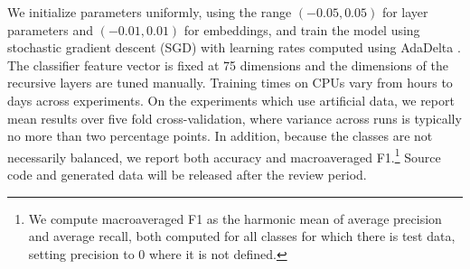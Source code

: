 We initialize parameters uniformly, using the range $(-0.05, 0.05)$ for layer parameters
and $(-0.01, 0.01)$ for embeddings, and train the model using stochastic gradient descent (SGD)
with learning rates computed using AdaDelta \cite{zeiler2012adadelta}.
The classifier feature vector is fixed at 75 dimensions and 
the dimensions of the recursive layers are tuned manually.
Training times on CPUs vary from hours to days across experiments.
On the experiments which use artificial data, we report mean
results over five fold cross-validation, where
variance across runs is typically no
more than two percentage points. In addition, because the classes are not necessarily balanced, 
we report both accuracy and macroaveraged F1.\footnote{We compute macroaveraged F1 
as the harmonic mean of average precision and average recall, both computed
for all classes for which there is test data, setting precision to 0 
where it is not defined.}
Source code and generated data will be released after the review period.

